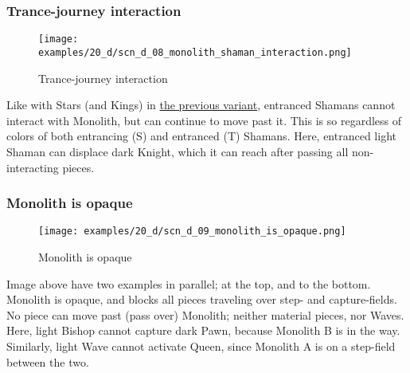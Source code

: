 \clearpage %

\subsubsection*{Trance-journey interaction}
\label{sec:Discovery/Monolith/Teleporting/Trance-journey interaction}

\vspace*{-1.4\baselineskip}
\noindent
\begin{figure}[!h]
\texttt{[image: examples/20\_d/scn\_d\_08\_monolith\_shaman\_interaction.png]}
\vspace*{-1.3\baselineskip}
\caption{Trance-journey interaction}
\label{fig:scn_d_08_monolith_shaman_interaction}
\end{figure}

\vspace*{-0.4\baselineskip}
Like with Stars (and Kings) in
\hyperref[fig:scn_cot_086_light_light_shaman_interaction_start]{the previous variant},
entranced Shamans cannot interact with Monolith, but can continue to move past it.
This is so regardless of colors of both entrancing (S) and entranced (T) Shamans.
Here, entranced light Shaman can displace dark Knight, which it can reach after
passing all non-interacting pieces.

\clearpage %

\subsubsection*{Monolith is opaque}
\label{sec:Discovery/Monolith/Movement/Monolith is opaque}

\vspace*{-1.4\baselineskip}
\noindent
\begin{figure}[!h]
\texttt{[image: examples/20\_d/scn\_d\_09\_monolith\_is\_opaque.png]}
\vspace*{-1.4\baselineskip}
\caption{Monolith is opaque}
\label{fig:scn_d_09_monolith_is_opaque}
\end{figure}

\vspace*{-0.5\baselineskip}
Image above have two examples in parallel; at the top, and to the bottom. \newline
\indent
Monolith is opaque, and blocks all pieces traveling over step- and capture-fields.
No piece can move past (pass over) Monolith; neither material pieces, nor Waves.
Here, light Bishop cannot capture dark Pawn, because Monolith B is in the way.
Similarly, light Wave cannot activate Queen, since Monolith A is on a step-field
between the two.

